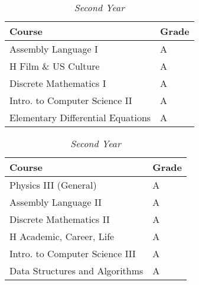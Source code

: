 \documentclass[11pt]{article}
\renewcommand{\it}[1]{\textit{{#1}}}
\renewcommand{\bf}[1]{\textbf{{#1}}}
\begin{document}
\begin{table}[H]
    \centering
    \vspace{-0.8em}
    \caption*{\it{Second Year}}
    \begin{tabular}{l|l}
        Course                             & Grade \\
        \hline
        Assembly Language I                & A \\
        H Film \& US Culture               & A \\
        Discrete Mathematics I             & A \\
        Intro. to Computer Science II      & A \\
        Elementary Differential Equations  & A \\


    \end{tabular}
    \hfill
    \begin{tabular}{l|l}
        Course                         & Grade \\
        \hline
        Physics III (General)          & A \\
        Assembly Language II           & A \\
        Discrete Mathematics II        & A \\
        H Academic, Career, Life       & A \\
        Intro. to Computer Science III & A \\
        Data Structures and Algorithms & A \\
    \end{tabular}
\end{table}
%
\end{document}
